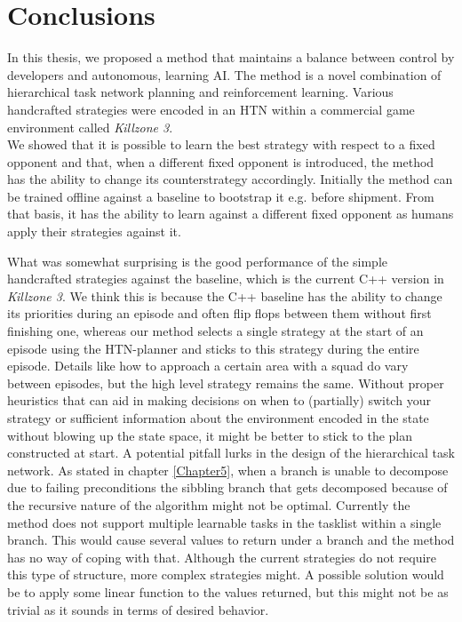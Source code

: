 \chapter{Conclusions} %
\label{Chapter7}
In this thesis, we proposed a method that maintains a balance between control
by developers and autonomous, learning AI. The method is a novel combination of
hierarchical task network planning and reinforcement learning. Various
handcrafted strategies were encoded in an HTN within a commercial game
environment called \emph{Killzone 3}.\\
We showed that it is possible to learn the best strategy with respect to a
fixed opponent and that, when a different fixed opponent is introduced, the
method has the ability to change its counterstrategy accordingly. Initially the
method can be trained offline against a baseline to bootstrap it e.g. before
shipment. From that basis, it has the ability to learn against a different
fixed opponent as humans apply their strategies against it.

What was somewhat surprising is the good performance of the simple handcrafted
strategies against the baseline, which is the current C++ version in
\emph{Killzone 3}. We think this is because the C++ baseline has the ability to
change its priorities during an episode and often flip flops between them
without first finishing one, whereas our method selects a single strategy at
the start of an episode using the HTN-planner and sticks to this strategy
during the entire episode. Details like how to approach a certain area with a
squad do vary between episodes, but the high level strategy remains the same.
Without proper heuristics that can aid in making decisions on when to
(partially) switch your strategy or sufficient information about the
environment encoded in the state without blowing up the state space, it might
be better to stick to the plan constructed at start.
A potential pitfall lurks in the design of the hierarchical task network. As
stated in chapter \ref{Chapter5}, when a branch is unable to decompose due to
failing preconditions the sibbling branch that gets decomposed because of the
recursive nature of the algorithm might not be optimal.
Currently the method does not support multiple learnable tasks in the tasklist
within a single branch. This would cause several values to return under a
branch and the method has no way of coping with that. Although the current
strategies do not require this type of structure, more complex strategies
might. A possible solution would be to apply some linear function to the values
returned, but this might not be as trivial as it sounds in terms of desired
behavior.

